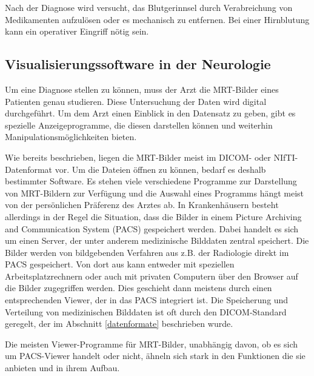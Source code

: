 Nach der Diagnose wird versucht, das Blutgerinnsel durch Verabreichung von Medikamenten aufzulösen oder es mechanisch zu entfernen. Bei einer Hirnblutung kann ein operativer Eingriff nötig sein.
\cite{schlaganfallBehandlung}

\subsection{Visualisierungssoftware in der Neurologie}
\label{radiologieSoftware}
Um eine Diagnose stellen zu können, muss der Arzt die MRT-Bilder eines Patienten genau studieren. Diese Untersuchung der Daten wird digital durchgeführt. Um dem Arzt einen Einblick in den Datensatz zu geben, gibt es spezielle Anzeigeprogramme, die diesen darstellen können und weiterhin Manipulationsmöglichkeiten bieten. 
  
Wie bereits beschrieben, liegen die MRT-Bilder meist im DICOM- oder NIfTI-Datenformat vor. Um die Dateien öffnen zu können, bedarf es deshalb bestimmter Software. Es stehen viele verschiedene Programme zur Darstellung von MRT-Bildern zur Verfügung und die Auswahl eines Programms hängt meist von der persönlichen Präferenz des Arztes ab. 
In Krankenhäusern besteht allerdings in der Regel die Situation, dass die Bilder in einem Picture Archiving and Communication System (PACS) gespeichert werden. Dabei handelt es sich um einen Server, der unter anderem medizinische Bilddaten zentral speichert. Die Bilder werden von bildgebenden Verfahren aus z.B. der Radiologie direkt im PACS gespeichert. Von dort aus kann entweder mit speziellen Arbeitsplatzrechnern oder auch mit privaten Computern über den Browser auf die Bilder zugegriffen werden. Dies geschieht dann meistens durch einen entsprechenden Viewer, der in das PACS integriert ist. Die Speicherung und Verteilung von medizinischen Bilddaten ist oft durch den DICOM-Standard geregelt, der im Abschnitt \ref{datenformate} beschrieben wurde.

Die meisten Viewer-Programme für MRT-Bilder, unabhängig davon, ob es sich um PACS-Viewer handelt oder nicht, ähneln sich stark in den Funktionen die sie anbieten und in ihrem Aufbau.

